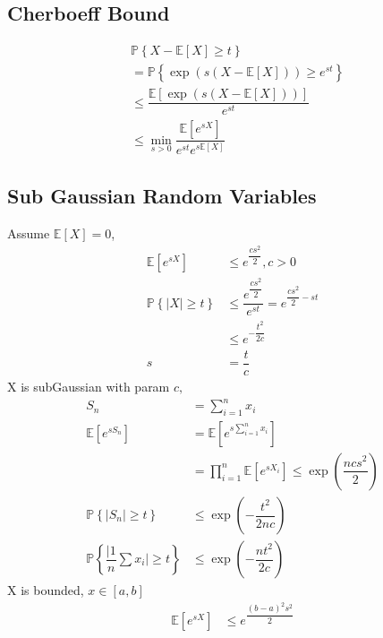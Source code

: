\documentclass{article}
\begin{document}
\subsection{Cherboeff Bound}
\begin{align*}
&  \mathbb{P}\left\{X - \mathbb{E}\left[X\right] \geq  t\right\}
\\ &= \mathbb{P}\left\{\exp\left(s \left(X - \mathbb{E}\left[X\right]\right)\right) \geq  e^{s t}\right\}
\\ &\leq  \dfrac{\mathbb{E}\left[\exp\left(s \left(X - \mathbb{E}\left[X\right]\right)\right)\right]}{e^{s t}}
\\ &\leq  \displaystyle\min_{s > 0} \dfrac{\mathbb{E}\left[e^{s X}\right]}{e^{s t} e^{s \mathbb{E}\left[X\right]}}
\end{align*}


\subsection{Sub Gaussian Random Variables}
Assume $\mathbb{E}\left[X\right] = 0$,
\begin{align*}
\mathbb{E}\left[e^{s X}\right] &\leq  e^{\dfrac{c s^{2}}{2}}, c > 0
\\ \mathbb{P}\left\{| X | \geq  t\right\} &\leq  \dfrac{e^{\dfrac{c s^{2}}{2}}}{e^{s t}} = e^{\dfrac{c s^{2}}{2} - s t}
\\ &\leq  e^{- \dfrac{t^{2}}{2 c}}
\\ s  &= \dfrac{t}{c}
\end{align*}
X is subGaussian with param $c, $
\begin{align*}
S_{n} &= \displaystyle\sum_{i=1}^{n} x_{i}
\\ \mathbb{E}\left[e^{s S_{n}}\right] &= \mathbb{E}\left[e^{s \displaystyle\sum_{i=1}^{n} x_{i}}\right]
\\ &= \displaystyle\prod_{i=1}^{n} \mathbb{E}\left[e^{s X_{i}}\right] \leq  \exp\left(\dfrac{n c s^{2}}{2}\right)
\\ \mathbb{P}\left\{ | S_{n} | \geq  t\right\} &\leq  \exp\left(- \dfrac{t^{2}}{2 n c}\right)
\\ \mathbb{P}\left\{ \dfrac{|1}{n} \displaystyle\sum x_{i} | \geq  t\right\} &\leq  \exp\left(- \dfrac{n t^{2}}{2 c}\right)
\end{align*}
X is bounded, $x  \in \left[a, b \right]$
\begin{align*}
\mathbb{E}\left[e^{s X}\right] &\leq  e^{\dfrac{\left(b - a\right)^{2} s^{2}}{2}}
\end{align*}
\end{document}

